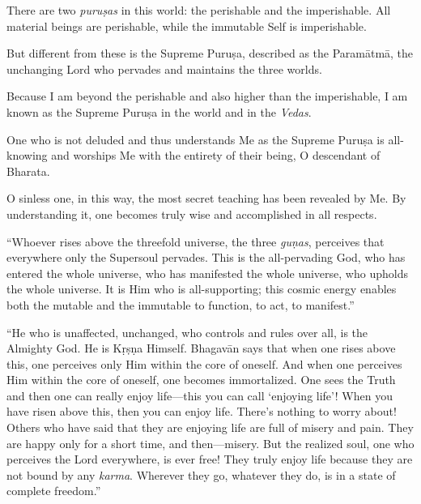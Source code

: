 {There are two \textit{puruṣas} in this world: the perishable and the imperishable. All material beings are perishable, while the immutable Self is imperishable.}

{But different from these is the Supreme Puruṣa, described as the Paramātmā, the unchanging Lord who pervades and maintains the three worlds.}

{Because I am beyond the perishable and also higher than the imperishable, I am known as the Supreme Puruṣa in the world and in the \textit{Vedas}.}

{One who is not deluded and thus understands Me as the Supreme Puruṣa is all-knowing and worships Me with the entirety of their being, O descendant of Bharata.}

{O sinless one, in this way, the most secret teaching has been revealed by Me. By understanding it, one becomes truly wise and accomplished in all respects.}

\enquote{Whoever rises above the threefold universe, the three \textit{guṇas}, perceives that everywhere only the Supersoul pervades. This is the all-pervading God, who has entered the whole universe, who has manifested the whole universe, who upholds the whole universe. It is Him who is all-supporting; this cosmic energy enables both the mutable and the immutable to function, to act, to manifest.}

\enquote{He who is unaffected, unchanged, who controls and rules over all, is the Almighty God. He is Kṛṣṇa Himself. Bhagavān says that when one rises above this, one perceives only Him within the core of oneself. And when one perceives Him within the core of oneself, one becomes immortalized. One sees the Truth and then one can really enjoy life---this you can call \enquote{enjoying life}! When you have risen above this, then you can enjoy life. There’s nothing to worry about! Others who have said that they are enjoying life are full of misery and pain. They are happy only for a short time, and then---misery. But the realized soul, one who perceives the Lord everywhere, is ever free! They truly enjoy life because they are not bound by any \textit{karma}. Wherever they go, whatever they do, is in a state of complete freedom.}

